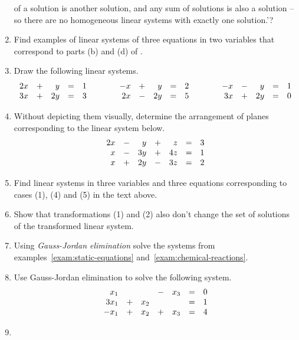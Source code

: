 \begin{enumerate}
 of a solution is another solution, and any sum of solutions is also a solution
 -- so there are no homogeneous linear systems with exactly one solution.'?
\item 
 Find examples of linear systems of three equations in two variables that
 correspond to parts (b) and (d) of .
\item 
 Draw the following linear systems.
 \[
  \begin{array}{r c r c r}
   2x & + & y & = & 1\\
   3x & + & 2y & = & 3
  \end{array}
  \hspace{3em}
  \begin{array}{r c r c r}
   -x & + & y & = & 2\\
   2x & - & 2y & = & 5
  \end{array}
  \hspace{3em}
  \begin{array}{r c r c r}
   -x & - & y & = & 1\\
   3x & + & 2y & = & 0
  \end{array}
 \]
\item 
 Without depicting them visually, determine the arrangement of planes
 corresponding to the linear system below.
 \[
  \begin{array}{r c r c r c r}
   2x & - & y & + & z & = & 3\\
   x & - & 3y & + & 4z & = & 1\\
   x & + & 2y & - & 3z & = & 2
  \end{array}
 \]
\item 
 Find linear systems in three variables and three equations corresponding to
 cases (1), (4) and (5) in the text above.
\item 
 Show that transformations (1) and (2) also don't change the set of solutions of
 the transformed linear system.
\item 
 Using \emph{Gauss-Jordan elimination} solve the systems from
 examples~\ref{exam:static-equations} and~\ref{exam:chemical-reactions}.
\item 
 Use Gauss-Jordan elimination to solve the following system.
 \[
  \begin{array}{r c r c r c r}
   x_1 & &  & - & x_3 & = & 0\\
   3x_1 & + & x_2 & & & = & 1\\
   -x_1 & + & x_2 & + & x_3 & = & 4
  \end{array}
 \]
\item 

\end{enumerate}
